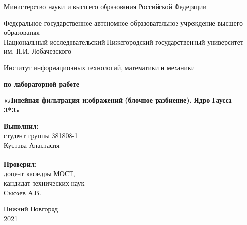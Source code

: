 \documentclass{report}
\begin{document}
\begin{titlepage}

\begin{center}
Министерство науки и высшего образования Российской Федерации
\end{center}

\begin{center}
Федеральное государственное автономное образовательное учреждение высшего образования \\
Национальный исследовательский Нижегородский государственный университет им. Н.И. Лобачевского
\end{center}

\begin{center}
Институт информационных технологий, математики и механики
\end{center}

\vspace{4em}

\begin{center}
\textbf{ по лабораторной работе} \\
\end{center}
\begin{center}
\textbf{\Large«Линейная фильтрация изображений (блочное разбиение). Ядро Гаусса 3*3»} \\
\end{center}

\vspace{4em}

\newbox{\lbox}
\newlength{\maxl}
\setlength{\maxl}{\wd\lbox}
\hfill\parbox{7cm}{
\hspace*{5cm}\hspace*{-5cm}\textbf{Выполнил:} \\ студент группы 381808-1 \\ Кустова Анастасия\\
\\
\hspace*{5cm}\hspace*{-5cm}\textbf{Проверил:}\\ доцент кафедры МОСТ, \\ кандидат технических наук \\ Сысоев А.В.\\
}
\vspace{\fill}

\begin{center} Нижний Новгород \\ 2021 \end{center}

\end{titlepage}
\end{document}
